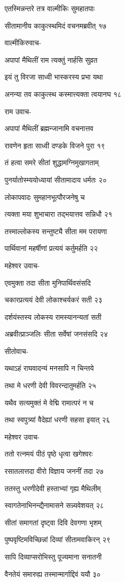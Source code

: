 एतस्मिन्नन्तरे तत्र वाल्मीकिः सुमहातपाः

सीतामानीय काकुत्स्थमिदं वचनमब्रवीत् १७

वाल्मीकिरुवाच-

अपापां मैथिलीं राम त्यक्तुं नार्हसि सुव्रत

इयं तु विरजा साध्वी भास्करस्य प्रभा यथा

अनन्या तव काकुत्स्थ कस्मात्त्यक्ता त्वयानघ १८

राम उवाच-

अपापां मैथिलीं ब्रह्मन्जानामि वचनात्तव

रावणेन हृता साध्वी दण्डके विजने पुरा १९

तं हत्वा समरे सीतां शुद्धामग्निमुखागताम्

पुनर्यातोस्म्ययोध्यायां सीतामादाय धर्मतः २०

लोकापवादः सुमहानभूत्पौरजनेषु च

त्यक्ता मया शुभाचारा तद्भयात्तव सन्निधौ २१

तस्माल्लोकस्य सन्तुष्ट्यै सीता मम परायणा

पार्थिवानां महर्षीणां प्रत्ययं कर्तुमर्हति २२

महेश्वर उवाच-

एवमुक्ता तदा सीता मुनिपार्थिवसंसदि

चकारप्रत्ययं देवी लोकाश्चर्यकरं सती २३

दर्शयंस्तस्य लोकस्य रामस्यानन्यतां सती

अब्रवीत्प्राञ्जलिः सीता सर्वेषां जनसंसदि २४

सीतोवाच-

यथाऽहं राघवादन्यं मनसापि न चिन्तये

तथा मे धरणी देवी विवरन्दातुमर्हति २५

यथैव सत्यमुक्तं मे वेद्मि रामात्परं न च

तथा स्वपुत्र्यां वैदेह्यां धरणी सहसा इयात् २६

महेश्वर उवाच-

ततो रत्नमयं पीठं पृष्ठे धृत्वा खगेश्वरः

रसातलात्तदा वीरो विज्ञाय जननीं तदा २७

ततस्तु धरणीदेवी हस्ताभ्यां गृह्य मैथिलीम्

स्वागतेनाभिनन्द्यैनामासने सन्न्यवेशयत् २८

सीतां समागतां दृष्ट्वा दिवि देवगणा भृशम्

पुष्पवृष्टिमविच्छिन्नां दिव्यां सीतामवाकिरन् २९

सापि दिव्याप्सरोभिस्तु पूज्यमाना सनातनी

वैनतेयं समारुह्य तस्मान्मार्गाद्दिवं ययौ ३०

